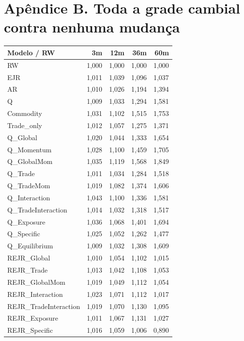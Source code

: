 \documentclass[11pt,a4paper]{article}
\begin{document}
\section*{Apêndice B. Toda a grade cambial contra nenhuma mudança}\footnotesize\begin{center}\begin{tabular}{lrrrr}\toprule
Modelo / RW & 3m & 12m & 36m & 60m \\ \midrule
RW & 1,000 & 1,000 & 1,000 & 1,000 \\
EJR & 1,011 & 1,039 & 1,096 & 1,037 \\
AR & 1,010 & 1,026 & 1,194 & 1,394 \\
Q & 1,009 & 1,033 & 1,294 & 1,581 \\
Commodity & 1,031 & 1,102 & 1,515 & 1,753 \\
Trade\_only & 1,012 & 1,057 & 1,275 & 1,371 \\
Q\_Global & 1,020 & 1,044 & 1,333 & 1,654 \\
Q\_Momentum & 1,028 & 1,100 & 1,459 & 1,705 \\
Q\_GlobalMom & 1,035 & 1,119 & 1,568 & 1,849 \\
Q\_Trade & 1,011 & 1,034 & 1,284 & 1,518 \\
Q\_TradeMom & 1,019 & 1,082 & 1,374 & 1,606 \\
Q\_Interaction & 1,043 & 1,100 & 1,336 & 1,581 \\
Q\_TradeInteraction & 1,014 & 1,032 & 1,318 & 1,517 \\
Q\_Exposure & 1,036 & 1,068 & 1,401 & 1,694 \\
Q\_Specific & 1,025 & 1,052 & 1,262 & 1,477 \\
Q\_Equilibrium & 1,009 & 1,032 & 1,308 & 1,609 \\
REJR\_Global & 1,010 & 1,054 & 1,102 & 1,015 \\
REJR\_Trade & 1,013 & 1,042 & 1,108 & 1,053 \\
REJR\_GlobalMom & 1,019 & 1,049 & 1,112 & 1,054 \\
REJR\_Interaction & 1,023 & 1,071 & 1,112 & 1,017 \\
REJR\_TradeInteraction & 1,019 & 1,070 & 1,130 & 1,095 \\
REJR\_Exposure & 1,011 & 1,067 & 1,131 & 1,027 \\
REJR\_Specific & 1,016 & 1,059 & 1,006 & 0,890 \\
\bottomrule\end{tabular}\end{center}\normalsize
\end{document}
